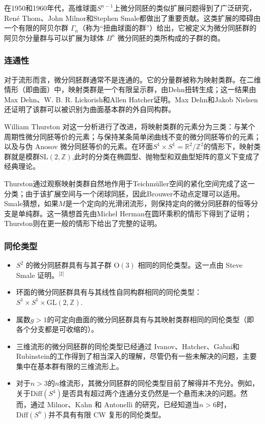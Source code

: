 在1950和1960年代，高维球面$S^{n-1}$上微分同胚的类似扩展问题得到了广泛研究，René Thom、John Milnor和Stephen Smale都做出了重要贡献。这类扩展的障碍由一个有限的阿贝尔群 $\Gamma_n$（称为“扭曲球面的群”）给出，它被定义为微分同胚群的阿贝尔分量群与可以扩展为球体 $B^n$ 微分同胚的类所构成的子群的商。
\subsubsection{连通性}
对于流形而言，微分同胚群通常不是连通的。它的分量群被称为映射类群。在二维情形（即曲面）中，映射类群是一个有限呈示群，由Dehn扭转生成；这一结果由Max Dehn、W. B. R. Lickorish和Allen Hatcher证明。Max Dehn和Jakob Nielsen还证明了该群可以被识别为曲面基本群的外自同构群。

William Thurston 对这一分析进行了改进，将映射类群的元素分为三类：与某个周期性微分同胚等价的元素；与保持某条简单闭曲线不变的微分同胚等价的元素；以及与伪 Anosov 微分同胚等价的元素。在环面$S^1 \times S^1 = \mathbb{R}^2 / \mathbb{Z}^2$的情形下，映射类群就是模群$\text{SL}(2, \mathbb{Z})$,此时的分类在椭圆型、抛物型和双曲型矩阵的意义下变成了经典理论。

Thurston通过观察映射类群自然地作用于Teichmüller空间的紧化空间完成了这一分类；由于该扩展空间与一个闭球同胚，因此Brouwer不动点定理可以适用。Smale猜想，如果$M$是一个定向的光滑闭流形，则保持定向的微分同胚群的恒等分支是单纯群。这一猜想首先由Michel Herman在圆环乘积的情形下得到了证明；Thurston则在更一般的情形下给出了完整的证明。
\subsubsection{同伦类型}
\begin{itemize}
\item $S^2$ 的微分同胚群具有与其子群 $\mathrm{O}(3)$ 相同的同伦类型。这一点由 Steve Smale 证明。\(^\text{[2]}\)
\item 环面的微分同胚群具有与其线性自同构群相同的同伦类型：$S^1 \times S^1 \times \mathrm{GL}(2, \mathbb{Z})$.
\item 属数$g > 1$的可定向曲面的微分同胚群具有与其映射类群相同的同伦类型（即各个分支都是可收缩的）。
\item 三维流形的微分同胚群的同伦类型已经通过 Ivanov、Hatcher、Gabai和 Rubinstein的工作得到了相当深入的理解，尽管仍有一些未解决的问题，主要集中在基本群有限的三维流形上。
\item 对于$n > 3$的$n$维流形，其微分同胚群的同伦类型目前了解得并不充分。例如，关于$\mathrm{Diff}(S^4)$是否具有超过两个连通分支仍然是一个悬而未决的问题。然而，通过 Milnor、Kahn 和 Antonelli 的研究，已经知道当$n > 6$时，$\mathrm{Diff}(S^n)$并不具有有限 CW 复形的同伦类型。
\end{itemize}
